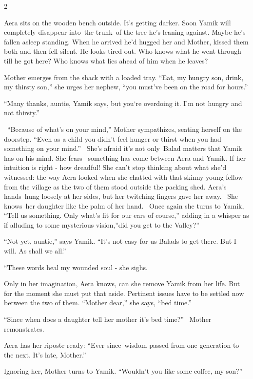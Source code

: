 \documentclass[letterpaper]{article}
\begin{document}
{2}

{Aera sits on the wooden bench
out}side{. }It's getting darker.
Soon{ Yamik will completely disappear into~the trunk~of the tree he's
leaning against. Maybe he's fallen asleep standing. When he }arrived he'd hugged her and Mother, kissed them both and
then fell silent. He looks tired out. Who knows what he went through till he got here? Who knows what lies ahead of him
when he leaves? 

Mother emerges from the shack with a loaded tray. {{}``Eat, my hungry
son, drink, my thirsty son,'' she urges her
}{nephew}{, ``you must've been on the road for
hours.''}

{{}``Many thanks, auntie,{\textquotedbl} Yamik says, {\textquotedbl}but
you`re overdoing it. I'm not hungry }and not {thirsty.''}

\ {}``Because of what's on your mind,'' Mother sympathizes, seating herself on the doorstep. ``Even as a child you
didn't feel hunger or thirst when you had something on your mind.''~ She's afraid it's not only~Balad matters that
Yamik has on his mind. She fears \ something has come between Aera and Yamik. If her intuition is right - how dreadful!
She can't stop thinking about what she'd witnessed: the way Aera looked when she chatted with that
skinny{ }young fellow from the village as the two of them stood outside the packing shed. Aera's
hands~hung loosely at her sides, but her twitching fingers gave her away.~ She knows~her daughter like the palm of her
hand.~ Once again she turns to Yamik, ``Tell us something. Only what's fit for our ears of course,'' adding in a
whisper as if alluding to some mysterious vision,''did{ }you get to the Valley?'' 

{}``Not yet, auntie,'' says Yamik. ``It's not easy for us Balads to get there. But I will. As shall we all.'' 

{}``These words heal my wounded soul -{\textquotedbl} she sighs.

Only in her imagination, Aera knows, can she remove Yamik from her life. But for the moment she must put that aside.
Pertinent issues have to be settled now between the two of them. ``Mother dear,'' she says, ``bed time.''~ 

{}``Since when does a daughter tell her mother it's bed time?'' \ Mother remonstrates.

Aera has her riposte ready: ``Ever since~wisdom passed from one generation to the next. It's late, Mother.'' 

Ignoring her, Mother turns to Yamik. ``Wouldn't you like some coffee, my son?'' 
\end{document}
